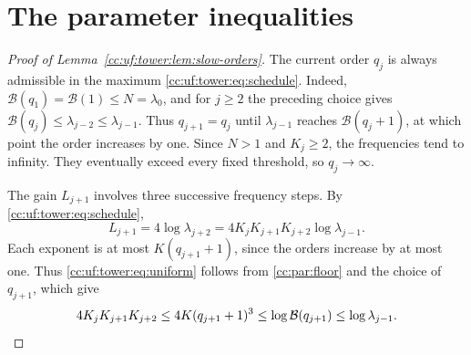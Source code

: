 \section{The parameter inequalities}\label{cc:app:parameters}
\begin{proof}[Proof of Lemma~\ref{cc:uf:tower:lem:slow-orders}]
The current order $q_j$ is always admissible in the maximum
\eqref{cc:uf:tower:eq:schedule}. Indeed, $\mathcal B(q_1)=\mathcal B(1)
\le N=\lambda_0$, and for $j\ge2$ the preceding choice gives
$\mathcal B(q_j)\le\lambda_{j-2}\le\lambda_{j-1}$. Thus $q_{j+1}=q_j$
until $\lambda_{j-1}$ reaches $\mathcal B(q_j+1)$, at which point the
order increases by one. Since $N>1$ and $K_j\ge2$, the frequencies tend
to infinity. They eventually exceed every fixed threshold, so
$q_j\to\infty$.

The gain $L_{j+1}$ involves three successive frequency steps. By
\eqref{cc:uf:tower:eq:schedule},
\[
 L_{j+1}=4\log\lambda_{j+2}
        =4K_jK_{j+1}K_{j+2}\log\lambda_{j-1}.
\]
Each exponent is at most $K(q_{j+1}+1)$, since the orders increase
by at most one. Thus \eqref{cc:uf:tower:eq:uniform} follows from
\eqref{cc:par:floor} and the choice of $q_{j+1}$, which give
\[
 4K_jK_{j+1}K_{j+2}\le4K(q_{j+1}+1)^3
 \le\log\mathcal B(q_{j+1})\le\log\lambda_{j-1}. \qedhere
\]
\end{proof}

